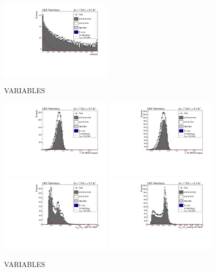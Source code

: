 \begin{figure}[hbt!]
\begin{center}
  \includegraphics[width=0.48\textwidth]{hgg7TeV/variablePlots/cosdphi}
 \label{fig:diphotonbdtvars1}
 \caption{VARIABLES}
\end{center}
\end{figure}

\begin{figure}[hbt!]
\begin{center}
  \includegraphics[width=0.48\textwidth]{hgg7TeV/variablePlots/phoid_1}
  \includegraphics[width=0.48\textwidth]{hgg7TeV/variablePlots/phoid_2}\\
  \includegraphics[width=0.48\textwidth]{hgg7TeV/variablePlots/sigmrv}
  \includegraphics[width=0.48\textwidth]{hgg7TeV/variablePlots/sigmwv}
 \label{fig:diphotonbdtvars2}
 \caption{VARIABLES}
\end{center}
\end{figure}

